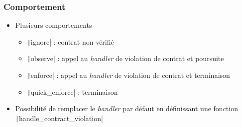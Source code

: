 \documentclass[C++.tex]{subfiles}
\begin{document}
\begin{frame}[fragile]
	\frametitle{Comportement}
	\begin{itemize}
		\item Plusieurs comportements
		\begin{itemize}
			\item \texttt|ignore| : contrat non vérifié
			\item \texttt|observe| : appel au \textit{handler} de violation de contrat et poursuite
			\item \texttt|enforce| : appel au \textit{handler} de violation de contrat et terminaison
			\item \texttt|quick_enforce| : terminaison

		\end{itemize}
		\item Possibilité de remplacer le \textit{handler} par défaut en définissant une fonction \texttt|handle_contract_violation|

	\end{itemize}

\end{frame}
\end{document}
